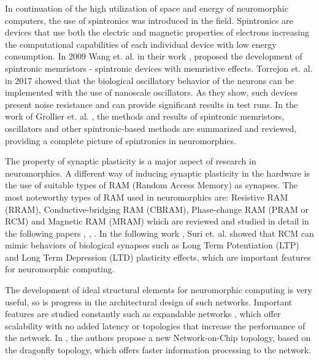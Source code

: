 \documentclass[12pt]{report}
\begin{document}
In continuation of the high utilization of space and energy of neuromorphic computers, the use of spintronics \cite{Utic2004} was introduced in the field. Spintronics are devices that use both the electric and magnetic properties of electrons increasing the computational capabilities of each individual device with low energy consumption. In 2009 Wang et. al. in their work \cite{Wang2009}, proposed the development of spintronic memristors - spintronic devices with memristive effects. Torrejon et. al. in 2017 \cite{Torrejon2017} showed that the biological oscillatory behavior of the neurons can be implemented with the use of nanoscale oscillators. As they show, such devices present noise resistance and can provide significant results in test runs. In the work of Grollier et. al. \cite{Grollier2020}, the methods and results of spintronic memristors, oscillators and other spintronic-based methods are summarized and reviewed, providing a complete picture of spintronics in neuromorphics.

The property of synaptic plasticity is a major aspect of research in neuromorphics. A different way of inducing synaptic plasticity in the hardware is the use of suitable types of RAM (Random Access Memory) as synapses. The most noteworthy types of RAM used in neuromorphics are: Resistive RAM (RRAM), Conductive-bridging RAM (CBRAM), Phase-change RAM (PRAM or RCM) and Magnetic RAM (MRAM) which are reviewed and studied in detail in the following papers \cite{Moon2019}, \cite{Cha2020}, \cite{Park2020}. In the following work \cite{Suri2011}, Suri et. al. showed that RCM can mimic behaviors of biological synapses such as Long Term Potentiation (LTP) and Long Term Depression (LTD) plasticity effects, which are important features for neuromorphic computing.

The development of ideal structural elements for neuromorphic computing is very useful, so is progress in the architectural design of such networks. Important features are studied constantly such as expandable networks \cite{Merolla2007}, which offer scalability with no added latency or topologies that increase the performance of the network. In \cite{Akbari2017}, the authors propose a new Network-on-Chip topology, based on the dragonfly topology, which offers faster information processing to the network.
\end{document}
